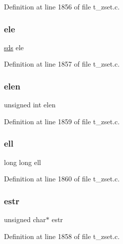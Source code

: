 Definition at line 1856 of file t\+\_\+zset.\+c.

\mbox{\label{structzsetopval_ac99cd495189c228ff8d538f04489805e}} 
\subsubsection{\texorpdfstring{ele}{ele}}
{\footnotesize\ttfamily \hyperlink{sds_8h_ad69abac3df4532879db9642c95f5ef6f}{sds} ele}



Definition at line 1857 of file t\+\_\+zset.\+c.

\mbox{\label{structzsetopval_a907e5fb6c87dd8624009bcc9f7f6cab6}} 
\subsubsection{\texorpdfstring{elen}{elen}}
{\footnotesize\ttfamily unsigned int elen}



Definition at line 1859 of file t\+\_\+zset.\+c.

\mbox{\label{structzsetopval_a80c5ae72fc44010a9f9adf075bb3e463}} 
\subsubsection{\texorpdfstring{ell}{ell}}
{\footnotesize\ttfamily long long ell}



Definition at line 1860 of file t\+\_\+zset.\+c.

\mbox{\label{structzsetopval_af919050b68e6784d3a0282866cf2e816}} 
\subsubsection{\texorpdfstring{estr}{estr}}
{\footnotesize\ttfamily unsigned char$\ast$ estr}



Definition at line 1858 of file t\+\_\+zset.\+c.


